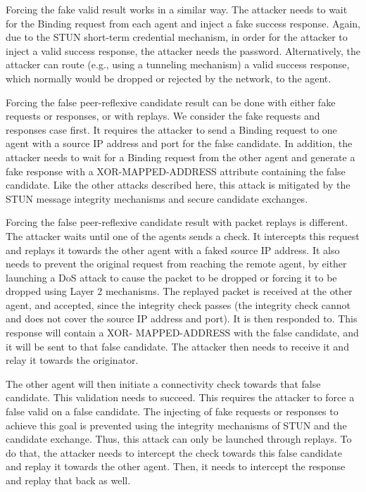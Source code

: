 \documentclass{article}
\begin{document}
Forcing the fake valid result works in a similar way.  The attacker needs to wait for the Binding request from each agent and inject a fake success response.  Again, due to the STUN short-term credential mechanism, in order for the attacker to inject a valid success response, the attacker needs the password.  Alternatively, the attacker can route (e.g., using a tunneling mechanism) a valid success response, which normally would be dropped or rejected by the network, to the agent.

Forcing the false peer-reflexive candidate result can be done with either fake requests or responses, or with replays.  We consider the fake requests and responses case first.  It requires the attacker to send a Binding request to one agent with a source IP address and port for the false candidate.  In addition, the attacker needs to wait for a Binding request from the other agent and generate a fake response with a XOR-MAPPED-ADDRESS attribute containing the false candidate. Like the other attacks described here, this attack is mitigated by the STUN message integrity mechanisms and secure candidate exchanges.

Forcing the false peer-reflexive candidate result with packet replays is different.  The attacker waits until one of the agents sends a check.  It intercepts this request and replays it towards the other agent with a faked source IP address.  It also needs to prevent the original request from reaching the remote agent, by either launching a DoS attack to cause the packet to be dropped or forcing it to be dropped using Layer 2 mechanisms.  The replayed packet is received at the other agent, and accepted, since the integrity check passes (the integrity check cannot and does not cover the source IP address and port).  It is then responded to.  This response will contain a XOR- MAPPED-ADDRESS with the false candidate, and it will be sent to that false candidate.  The attacker then needs to receive it and relay it towards the originator.

The other agent will then initiate a connectivity check towards that false candidate.  This validation needs to succeed.  This requires the attacker to force a false valid on a false candidate.  The injecting of fake requests or responses to achieve this goal is prevented using the integrity mechanisms of STUN and the candidate exchange.  Thus, this attack can only be launched through replays. To do that, the attacker needs to intercept the check towards this false candidate and replay it towards the other agent.  Then, it needs to intercept the response and replay that back as well.
\end{document}
